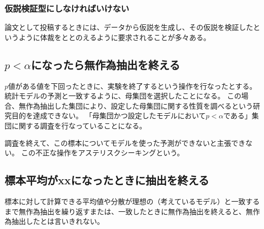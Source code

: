 \subsubsection{仮説検証型にしなければいけない}
論文として投稿するときには、データから仮説を生成し、その仮説を検証したというように体裁をととのえるように要求されることが多々ある。



\subsection{$p<\alpha$になったら無作為抽出を終える}
$p$値がある値を下回ったときに、実験を終了するという操作を行なったとする。
統計モデルの予測と一致するように、母集団を選択したことになる。
この場合、無作為抽出した集団により、設定した母集団に関する性質を調べるという研究目的を達成できない。
「母集団かつ設定したモデルにおいて$p<\alpha$である」集団に関する調査を行なっていることになる。

調査を終えて、この標本についてモデルを使った予測ができないと主張できない。
この不正な操作をアステリスクシーキングという。


\subsection{標本平均がxxになったときに抽出を終える}
標本に対して計算できる平均値や分散が理想の（考えているモデル）と一致するまで無作為抽出を繰り返すまたは、一致したときに無作為抽出を終えると、無作為抽出したとは言いきれない。


